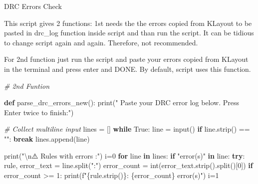 \documentclass[
  11pt,
  a4paper,
  oneside]{scrbook}
\newenvironment{Shaded}{}{}
\newcommand{\BuiltInTok}[1]{\textcolor[rgb]{0.00,0.50,0.00}{#1}}
\newcommand{\CharTok}[1]{\textcolor[rgb]{0.25,0.44,0.63}{#1}}
\newcommand{\CommentTok}[1]{\textcolor[rgb]{0.38,0.63,0.69}{\textit{#1}}}
\newcommand{\ControlFlowTok}[1]{\textcolor[rgb]{0.00,0.44,0.13}{\textbf{#1}}}
\newcommand{\DecValTok}[1]{\textcolor[rgb]{0.25,0.63,0.44}{#1}}
\newcommand{\KeywordTok}[1]{\textcolor[rgb]{0.00,0.44,0.13}{\textbf{#1}}}
\newcommand{\NormalTok}[1]{#1}
\newcommand{\OperatorTok}[1]{\textcolor[rgb]{0.40,0.40,0.40}{#1}}
\newcommand{\SpecialCharTok}[1]{\textcolor[rgb]{0.25,0.44,0.63}{#1}}
\newcommand{\SpecialStringTok}[1]{\textcolor[rgb]{0.73,0.40,0.53}{#1}}
\newcommand{\StringTok}[1]{\textcolor[rgb]{0.25,0.44,0.63}{#1}}
\newcommand{\VariableTok}[1]{\textcolor[rgb]{0.10,0.09,0.49}{#1}}
\begin{document}
\begin{tcolorbox}[enhanced jigsaw, opacityback=0, breakable, colback=white, left=2mm, toprule=.15mm, arc=.35mm, coltitle=black, leftrule=.75mm, colbacktitle=quarto-callout-note-color!10!white, rightrule=.15mm, colframe=quarto-callout-note-color-frame, titlerule=0mm, title=\textcolor{quarto-callout-note-color}{\faInfo}\hspace{0.5em}{Script}, toptitle=1mm, bottomtitle=1mm, bottomrule=.15mm, opacitybacktitle=0.6]

DRC Errors Check

This script gives 2 functions: 1st needs the the errors copied from
KLayout to be pasted in drc\_log function inside script and than run the
script. It can be tidious to change script again and again. Therefore,
not recommended.

For 2nd function just run the script and paste your errors copied from
KLayout in the terminal and press enter and DONE. By default, script
uses this function.

\begin{Shaded}
\begin{Highlighting}[]
\CommentTok{\# 2nd Funtion}

\KeywordTok{def}\NormalTok{ parse\_drc\_errors\_new():}
    \BuiltInTok{print}\NormalTok{(}\StringTok{" Paste your DRC error log below. Press Enter twice to finish:"}\NormalTok{)}
    
    \CommentTok{\# Collect multiline input}
\NormalTok{    lines }\OperatorTok{=}\NormalTok{ []}
    \ControlFlowTok{while} \VariableTok{True}\NormalTok{:}
\NormalTok{        line }\OperatorTok{=} \BuiltInTok{input}\NormalTok{()}
        \ControlFlowTok{if}\NormalTok{ line.strip() }\OperatorTok{==} \StringTok{""}\NormalTok{:}
            \ControlFlowTok{break}
\NormalTok{        lines.append(line)}
    
    \BuiltInTok{print}\NormalTok{(}\StringTok{"}\CharTok{\textbackslash{}n}\StringTok{⚠️ Rules with errors :"}\NormalTok{)}
\NormalTok{    i}\OperatorTok{=}\DecValTok{0}
    \ControlFlowTok{for}\NormalTok{ line }\KeywordTok{in}\NormalTok{ lines:}
        \ControlFlowTok{if} \StringTok{"error(s)"} \KeywordTok{in}\NormalTok{ line:}
            \ControlFlowTok{try}\NormalTok{:}
\NormalTok{                rule, error\_text }\OperatorTok{=}\NormalTok{ line.split(}\StringTok{":"}\NormalTok{)}
\NormalTok{                error\_count }\OperatorTok{=} \BuiltInTok{int}\NormalTok{(error\_text.strip().split()[}\DecValTok{0}\NormalTok{])}
                \ControlFlowTok{if}\NormalTok{ error\_count }\OperatorTok{\textgreater{}=} \DecValTok{1}\NormalTok{:}
                    \BuiltInTok{print}\NormalTok{(}\SpecialStringTok{f"}\SpecialCharTok{\{}\NormalTok{rule}\SpecialCharTok{.}\NormalTok{strip()}\SpecialCharTok{\}}\SpecialStringTok{: }\SpecialCharTok{\{}\NormalTok{error\_count}\SpecialCharTok{\}}\SpecialStringTok{ error(s)"}\NormalTok{)}
\NormalTok{                    i}\OperatorTok{=}\DecValTok{1}


\end{Highlighting}
\end{Shaded}
\end{tcolorbox}
\end{document}
